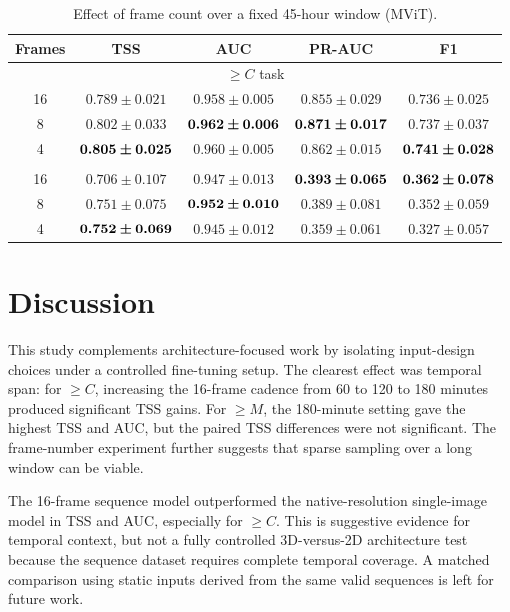 \documentclass[runningheads]{llncs}
\begin{document}
\begin{table}[H]
\caption{Effect of frame count over a fixed 45-hour window (MViT).}
\centering
\label{tab:frames}
\scriptsize
\setlength{\tabcolsep}{6pt}
\begin{tabular}{@{}ccccc@{}}
\toprule
Frames & TSS & AUC & PR-AUC & F1 \\
\midrule
\multicolumn{5}{c}{$\geq C$ task} \\
\midrule
16 & $0.789 \pm 0.021$ & $0.958 \pm 0.005$ & $0.855 \pm 0.029$ & $0.736 \pm 0.025$ \\
8  & $0.802 \pm 0.033$ & $\bm{0.962 \pm 0.006}$ & $\bm{0.871 \pm 0.017}$ & $0.737 \pm 0.037$ \\
4  & $\bm{0.805 \pm 0.025}$ & $0.960 \pm 0.005$ & $0.862 \pm 0.015$ & $\bm{0.741 \pm 0.028}$ \\
\addlinespace
\multicolumn{5}{c}{$\geq M$ task} \\
\midrule
16 & $0.706 \pm 0.107$ & $0.947 \pm 0.013$ & $\bm{0.393 \pm 0.065}$ & $\bm{0.362 \pm 0.078}$ \\
8  & $0.751 \pm 0.075$ & $\bm{0.952 \pm 0.010}$ & $0.389 \pm 0.081$ & $0.352 \pm 0.059$ \\
4  & $\bm{0.752 \pm 0.069}$ & $0.945 \pm 0.012$ & $0.359 \pm 0.061$ & $0.327 \pm 0.057$ \\
\bottomrule
\end{tabular}
\end{table}

\section{Discussion}

This study complements architecture-focused work by isolating input-design choices under a controlled fine-tuning setup. The clearest effect was temporal span: for $\geq C$, increasing the 16-frame cadence from 60 to 120 to 180 minutes produced significant TSS gains. For $\geq M$, the 180-minute setting gave the highest TSS and AUC, but the paired TSS differences were not significant. The frame-number experiment further suggests that sparse sampling over a long window can be viable.

The 16-frame sequence model outperformed the native-resolution single-image model in TSS and AUC, especially for $\geq C$. This is suggestive evidence for temporal context, but not a fully controlled 3D-versus-2D architecture test because the sequence dataset requires complete temporal coverage. A matched comparison using static inputs derived from the same valid sequences is left for future work.
\end{document}
